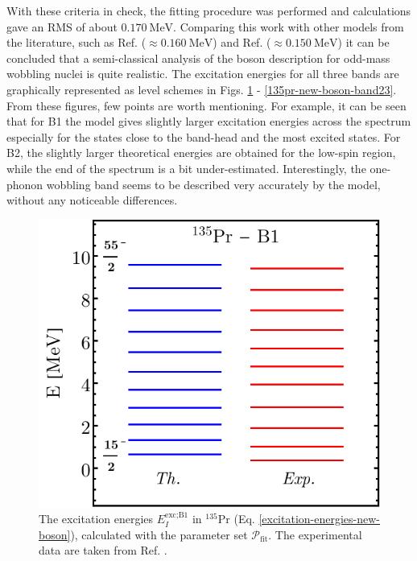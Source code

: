 With these criteria in check, the fitting procedure was performed and calculations gave an RMS of about $0.170\ \text{MeV}$. Comparing this work with other models from the literature, such as Ref. \cite{chen2016wobbling} ($\approx0.160\ \text{MeV}$) and Ref. \cite{budaca2018tilted} ($\approx0.150\ \text{MeV}$) it can be concluded that a semi-classical analysis of the boson description for odd-mass wobbling nuclei is quite realistic. The excitation energies for all three bands are graphically represented as level schemes in Figs. \ref{135pr-new-boson-band1} - \ref{135pr-new-boson-band23}. From these figures, few points are worth mentioning. For example, it can be seen that for B1 the model gives slightly larger excitation energies across the spectrum especially for the states close to the band-head and the most excited states. For B2, the slightly larger theoretical energies are obtained for the low-spin region, while the end of the spectrum is a bit under-estimated. Interestingly, the one-phonon wobbling band seems to be described very accurately by the model, without any noticeable differences. 
\begin{figure}[b] %
    \centering
    \includegraphics[scale=0.85]{Chapters/Figures/135Pr-New-Boson-Band1-Energies.pdf}
    \caption{The excitation energies $E_I^\text{exc;B1}$ in $^{135}$Pr (Eq. \ref{excitation-energies-new-boson}), calculated with the parameter set $\mathcal{P}_\text{fit}$. The experimental data are taken from Ref. \cite{sensharma2019two}.}
    \label{135pr-new-boson-band1}
\end{figure}
